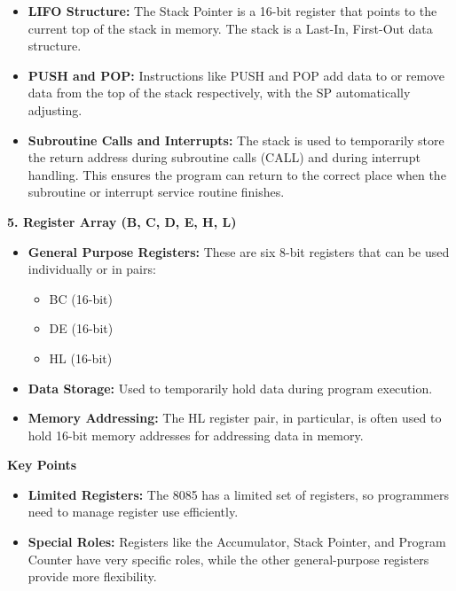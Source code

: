\documentclass[
]{article}
\begin{document}
\begin{itemize}
\item
  \textbf{LIFO Structure:} The Stack Pointer is a 16-bit register that
  points to the current top of the stack in memory. The stack is a
  Last-In, First-Out data structure.
\item
  \textbf{PUSH and POP:} Instructions like PUSH and POP add data to or
  remove data from the top of the stack respectively, with the SP
  automatically adjusting.
\item
  \textbf{Subroutine Calls and Interrupts:} The stack is used to
  temporarily store the return address during subroutine calls (CALL)
  and during interrupt handling. This ensures the program can return to
  the correct place when the subroutine or interrupt service routine
  finishes.
\end{itemize}

\textbf{5. Register Array (B, C, D, E, H, L)}

\begin{itemize}
\item
  \textbf{General Purpose Registers:} These are six 8-bit registers that
  can be used individually or in pairs:

  \begin{itemize}
  \item
    BC (16-bit)
  \item
    DE (16-bit)
  \item
    HL (16-bit)
  \end{itemize}
\item
  \textbf{Data Storage:} Used to temporarily hold data during program
  execution.
\item
  \textbf{Memory Addressing:} The HL register pair, in particular, is
  often used to hold 16-bit memory addresses for addressing data in
  memory.
\end{itemize}

\textbf{Key Points}

\begin{itemize}
\item
  \textbf{Limited Registers:} The 8085 has a limited set of registers,
  so programmers need to manage register use efficiently.
\item
  \textbf{Special Roles:} Registers like the Accumulator, Stack Pointer,
  and Program Counter have very specific roles, while the other
  general-purpose registers provide more flexibility.
\end{itemize}
\end{document}

